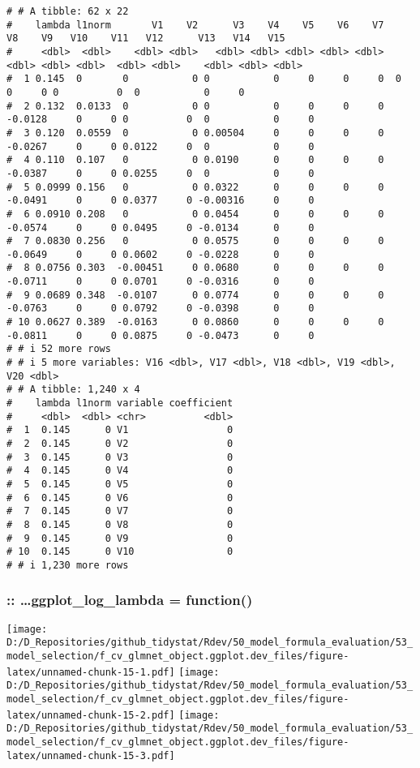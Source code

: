 \documentclass[
]{article}
\begin{document}
\begin{verbatim}
# # A tibble: 62 x 22
#    lambda l1norm       V1    V2      V3    V4    V5    V6    V7      V8    V9   V10    V11   V12      V13   V14   V15
#     <dbl>  <dbl>    <dbl> <dbl>   <dbl> <dbl> <dbl> <dbl> <dbl>   <dbl> <dbl> <dbl>  <dbl> <dbl>    <dbl> <dbl> <dbl>
#  1 0.145  0       0           0 0           0     0     0     0  0          0     0 0          0  0           0     0
#  2 0.132  0.0133  0           0 0           0     0     0     0 -0.0128     0     0 0          0  0           0     0
#  3 0.120  0.0559  0           0 0.00504     0     0     0     0 -0.0267     0     0 0.0122     0  0           0     0
#  4 0.110  0.107   0           0 0.0190      0     0     0     0 -0.0387     0     0 0.0255     0  0           0     0
#  5 0.0999 0.156   0           0 0.0322      0     0     0     0 -0.0491     0     0 0.0377     0 -0.00316     0     0
#  6 0.0910 0.208   0           0 0.0454      0     0     0     0 -0.0574     0     0 0.0495     0 -0.0134      0     0
#  7 0.0830 0.256   0           0 0.0575      0     0     0     0 -0.0649     0     0 0.0602     0 -0.0228      0     0
#  8 0.0756 0.303  -0.00451     0 0.0680      0     0     0     0 -0.0711     0     0 0.0701     0 -0.0316      0     0
#  9 0.0689 0.348  -0.0107      0 0.0774      0     0     0     0 -0.0763     0     0 0.0792     0 -0.0398      0     0
# 10 0.0627 0.389  -0.0163      0 0.0860      0     0     0     0 -0.0811     0     0 0.0875     0 -0.0473      0     0
# # i 52 more rows
# # i 5 more variables: V16 <dbl>, V17 <dbl>, V18 <dbl>, V19 <dbl>, V20 <dbl>
# # A tibble: 1,240 x 4
#    lambda l1norm variable coefficient
#     <dbl>  <dbl> <chr>          <dbl>
#  1  0.145      0 V1                 0
#  2  0.145      0 V2                 0
#  3  0.145      0 V3                 0
#  4  0.145      0 V4                 0
#  5  0.145      0 V5                 0
#  6  0.145      0 V6                 0
#  7  0.145      0 V7                 0
#  8  0.145      0 V8                 0
#  9  0.145      0 V9                 0
# 10  0.145      0 V10                0
# # i 1,230 more rows
\end{verbatim}

\hypertarget{ggplot_log_lambda-function}{%
\subsubsection{:: \ldots ggplot\_log\_lambda =
function()}\label{ggplot_log_lambda-function}}

\texttt{[image: D:/D\_Repositories/github\_tidystat/Rdev/50\_model\_formula\_evaluation/53\_model\_selection/f\_cv\_glmnet\_object.ggplot.dev\_files/figure-latex/unnamed-chunk-15-1.pdf]}
\texttt{[image: D:/D\_Repositories/github\_tidystat/Rdev/50\_model\_formula\_evaluation/53\_model\_selection/f\_cv\_glmnet\_object.ggplot.dev\_files/figure-latex/unnamed-chunk-15-2.pdf]}
\texttt{[image: D:/D\_Repositories/github\_tidystat/Rdev/50\_model\_formula\_evaluation/53\_model\_selection/f\_cv\_glmnet\_object.ggplot.dev\_files/figure-latex/unnamed-chunk-15-3.pdf]}
\end{document}

